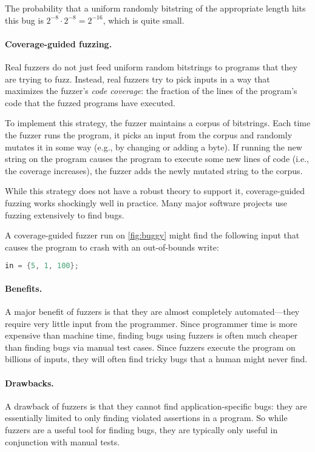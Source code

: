 The probability that a uniform randomly bitstring of the appropriate length
hits this bug is $2^{-8} \cdot 2^{-8} = 2^{-16}$, which is quite small.

\paragraph{Coverage-guided fuzzing.}
Real fuzzers do not just feed uniform random bitstrings to programs
that they are trying to fuzz. 
Instead, real fuzzers try to pick inputs in a way that maximizes
the fuzzer's \emph{code coverage}: the fraction of the lines of 
the program's code that the fuzzed programs have executed.

To implement this strategy, the fuzzer maintains a corpus of bitstrings.
Each time the fuzzer runs the program, it picks an input from the
corpus and randomly mutates it in some way (e.g., by changing or adding a byte).
If running the new string on the program causes the program to execute
some new lines of code (i.e., the coverage increases), the fuzzer adds
the newly mutated string to the corpus.

While this strategy does not have a robust theory to support it, 
coverage-guided fuzzing works shockingly well in practice.
Many major software projects use fuzzing extensively to find bugs.

A coverage-guided fuzzer run on \cref{fig:buggy} might find the
following input that causes the program to crash with an 
out-of-bounds write:
\begin{lstlisting}[language=c]
in = {5, 1, 100};
\end{lstlisting}


\paragraph{Benefits.}
A major benefit of fuzzers is that they are almost completely automated---they
require very little input from the programmer. Since programmer time is more
expensive than machine time, finding bugs using fuzzers is often much cheaper
than finding bugs via manual test cases.
Since fuzzers execute the program on billions of inputs, they will 
often find tricky bugs that a human might never find.

\paragraph{Drawbacks.}
A drawback of fuzzers is that they cannot find application-specific bugs:
they are essentially limited to only finding violated assertions in a program.
So while fuzzers are a useful tool for finding bugs, they are typically only 
useful in conjunction with manual tests.

